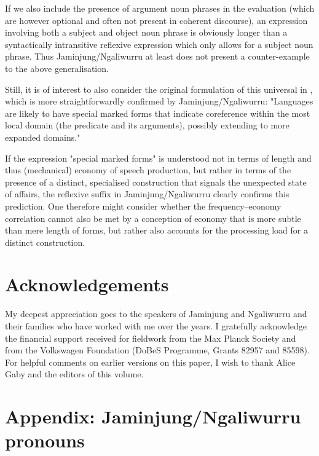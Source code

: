 \documentclass[output=paper,colorlinks,citecolor=brown]{langscibook}
\begin{document}
If we also include the presence of argument noun phrases in the evaluation (which are however optional and often not present in coherent discourse), an expression involving both a subject and object noun phrase is obviously longer than a syntactically intransitive reflexive expression which only allows for a subject noun phrase. Thus Jaminjung/Ngaliwurru at least does not present a counter-example to the above generalisation.

Still, it is of interest to also consider the original formulation of this universal in \citet[338]{Comrie1998}, which is more straightforwardly confirmed by Jaminjung/Ngaliwurru: "Languages are likely to have special marked forms that indicate coreference within the most local domain (the predicate and its arguments), possibly extending to more expanded domains."

If the expression "special marked forms" is understood not in terms of length and thus (mechanical) economy of speech production, but rather in terms of the presence of a distinct, specialised construction that signals the unexpected state of affairs, the reflexive suffix in Jaminjung/Ngaliwurru clearly confirms this prediction. One therefore might consider whether the frequency–economy correlation cannot also be met by a conception of economy that is more subtle than mere length of forms, but rather also accounts for the processing load for a distinct construction.

\section*{Acknowledgements}

My deepest appreciation goes to the speakers of Jaminjung and Ngaliwurru and their families who have worked with me over the years. I gratefully acknowledge the financial support received for fieldwork from the Max Planck Society and from the Volkswagen Foundation (DoBeS Programme, Grants 82957 and 85598). For helpful comments on earlier versions on this paper, I wish to thank Alice Gaby and the editors of this volume.

\section*{Appendix: Jaminjung/Ngaliwurru pronouns}
\end{document}
